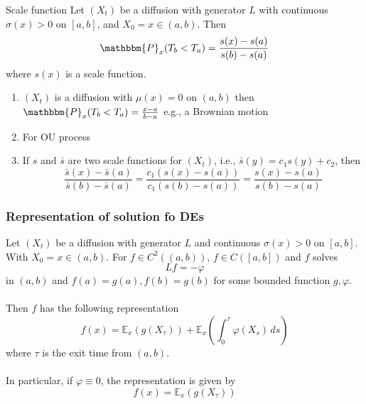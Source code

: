 \documentclass[12pt,a4paper]{article}
\newcommand{\E}{\mathbb{E}}
\begin{document}
    \begin{theorem}{Scale function}{}
        Let $(X_t)$ be a diffusion with generator $L$ with continuous $\sigma(x)>0$ on $[a,b]$, and $X_0=x\in(a,b)$. Then
        $$
        \mathbbm{P}_x(T_b<T_a) = \frac{s(x)-s(a)}{s(b)-s(a)}
        $$
        where $s(x)$ is a scale function.
    \end{theorem}
    \begin{remark}{}{}
        \begin{enumerate}
            \item $(X_t)$ is a diffusion with $\mu(x)=0$ on $(a,b)$ then $\mathbbm{P}_x(T_b<T_a) = \frac{x-a}{b-a}$ e.g., a Brownian motion
            \item For OU process
            \item If $s$ and $\bar s$ are two scale functions for $(X_t)$, i.e., $\bar s(y) = c_1s(y)+c_2$, then
            $$
            \frac{\bar s(x)-\bar s(a)}{\bar s(b)-\bar s(a)} = \frac{c_1(s(x)-s(a))}{c_1(s(b)-s(a))}=\frac{s(x)-s(a)}{s(b)-s(a)}
            $$
        \end{enumerate}
    \end{remark}
    \pagebreak
    \subsubsection{Representation of solution fo DEs}
    \begin{theorem}{}{}
        Let $(X_t)$ be a diffusion with generator $L$ and continuous $\sigma(x)>0$ on $[a,b]$. With $X_0=x\in(a,b)$. For $f\in C^2((a,b))$, $f\in C([a,b])$ and $f$ solves
        $$
        Lf=-\varphi
        $$
        in $(a,b)$ and $f(a)=g(a), f(b)=g(b)$ for some bounded function $g,\varphi$.\\
        \\
        Then $f$ has the following representation
        $$
        f(x) = \E_x(g(X_\tau)) + \E_x\left(\int_0^\tau \varphi(X_s)\, ds\right)
        $$
        where $\tau$ is the exit time from $(a,b)$.\\
        \\
        In particular, if $\varphi\equiv 0$, the representation is given by
        $$
        f(x) = \E_x(g(X_\tau))
        $$
    \end{theorem}
    \pagebreak
\end{document}
